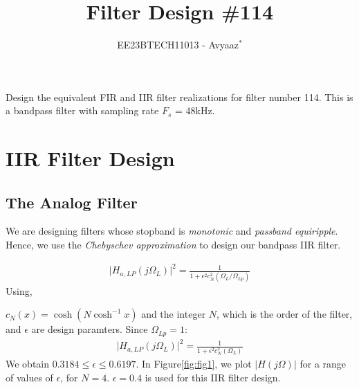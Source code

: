 \documentclass[journal,12pt,twocolumn]{IEEEtran}
\theoremstyle{remark}
\begin{document}

\vspace{3cm}

\title{Filter Design \#114}
\author{EE23BTECH11013 - Avyaaz$^{*}$%
}
\maketitle
\newpage
\bigskip

\renewcommand{\thefigure}{\arabic{figure}}
\renewcommand{\thetable}{\arabic{table}}



%  
Design the equivalent FIR and IIR filter realizations for filter number 114.  
This is a bandpass filter with sampling rate $F_s$ = 48kHz.
\section{IIR Filter Design}
\subsection{The Analog Filter}
 We are designing filters whose stopband is {\em monotonic} and {\em passband equiripple}.  
Hence, we use the {\em Chebyschev approximation} to design our bandpass IIR filter.

\begin{align}
\label{lpfirst}
\vert H_{a,LP}(j\Omega_L)\vert^2 = \frac{1}{1 + \epsilon^2c_N^2(\Omega_L/\Omega_{Lp})}
\end{align}
Using,

 $c_N(x) = \cosh(N \cosh^{-1}x)$ and the integer $N$, which is the order of the filter, and $\epsilon$ are design paramters.  Since $\Omega_{Lp} = 1$:
 \begin{align}
     \vert H_{a,LP}(j\Omega_L)\vert^2 = \frac{1}{1 + \epsilon^2c_N^2(\Omega_L)}
 \end{align}
 We obtain $0.3184 \leq \epsilon \leq 0.6197$.  In Figure\eqref{fig:fig1}, we plot $\vert H(j\Omega)\vert$ for a range of values of $\epsilon$, for $N = 4$. $\epsilon = 0.4$  is used for this IIR filter design.  
\end{document}
